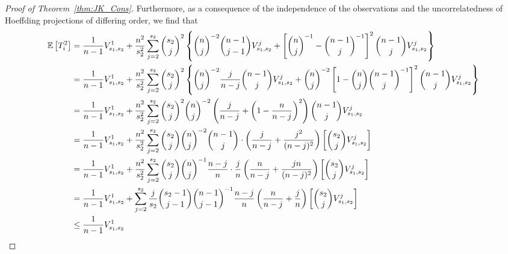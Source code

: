 \begin{proof}[Proof of Theorem~\ref{thm:JK_Cons}]
	Furthermore, as a consequence of the independence of the observations and the
	uncorrelatedness of Hoeffding projections of differing order, we find that
	\begin{equation}
		\begin{aligned}
			\E\left[T_{i}^{2}\right]
			 & = \frac{1}{n-1} V_{s_1, s_2}^{1}
			+ \frac{n^2}{s_2^2}\sum_{j = 2}^{s_2}\binom{s_2}{j}^2\left\{
			\binom{n}{j}^{-2}\binom{n-1}{j-1}V_{s_1, s_2}^{j}
			+ \left[\binom{n}{j}^{-1} - \binom{n - 1}{j}^{-1}\right]^2 \binom{n-1}{j}V_{s_1, s_2}^{j}
			\right\}                                                                                                                         \\
			 & = \frac{1}{n-1} V_{s_1, s_2}^{1}
			+ \frac{n^2}{s_2^2}\sum_{j = 2}^{s_2}\binom{s_2}{j}^2\left\{
			\binom{n}{j}^{-2}\frac{j}{n - j}\binom{n-1}{j}V_{s_1, s_2}^{j}
			+ \binom{n}{j}^{-2}\left[1 - \binom{n}{j}\binom{n - 1}{j}^{-1}\right]^2 \binom{n-1}{j}V_{s_1, s_2}^{j}
			\right\}                                                                                                                         \\
			 & = \frac{1}{n-1} V_{s_1, s_2}^{1}
			+ \frac{n^2}{s_2^2}\sum_{j = 2}^{s_2}\binom{s_2}{j}^2\binom{n}{j}^{-2}
			\left(\frac{j}{n - j} + \left(1 - \frac{n}{n - j}\right)^2\right) \binom{n-1}{j}V_{s_1, s_2}^{j}                                 \\
			 & = \frac{1}{n-1} V_{s_1, s_2}^{1}
			+ \frac{n^2}{s_2^2}\sum_{j = 2}^{s_2}\binom{s_2}{j}
			\binom{n}{j}^{-2}\binom{n-1}{j} \cdot \left(\frac{j}{n - j} + \frac{j^2}{(n - j)^2}\right)
			\left[\binom{s_2}{j}V_{s_1, s_2}^{j}\right]                                                                                      \\
			 & = \frac{1}{n-1} V_{s_1, s_2}^{1}
			+ \frac{n^2}{s_2^2}\sum_{j = 2}^{s_2}\binom{s_2}{j}\binom{n}{j}^{-1}
			\frac{n - j}{n} \cdot \frac{j}{n}\left(\frac{n}{n - j} + \frac{j n}{(n - j)^2}\right)
			\left[\binom{s_2}{j}V_{s_1, s_2}^{j}\right]                                                                                      \\
			 & =  \frac{1}{n-1} V_{s_1, s_2}^{1}
			+ \sum_{j = 2}^{s_2}\frac{j}{s_2}
			\binom{s_2 - 1}{j - 1}\binom{n-1}{j-1}^{-1}
			\frac{n - j}{n} \left(\frac{n}{n - j} + \frac{j}{n}\right)
			\left[\binom{s_2}{j}V_{s_1, s_2}^{j}\right]                                                                                      \\
			 & \leq \frac{1}{n-1} V_{s_1, s_2}^{1}

\end{aligned}
\end{equation}
\end{proof}
